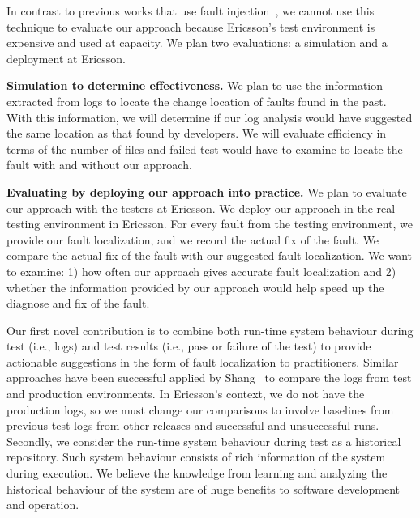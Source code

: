In contrast to previous works that use fault injection~\cite{todo}, we cannot use this technique to evaluate our approach because Ericsson's test environment is expensive and used at capacity. We plan two evaluations: a simulation and a deployment at Ericsson.

\noindent \textbf{Simulation to determine effectiveness.} We plan to use the information extracted from logs to locate the change location of faults found in the past. With this information, we will determine if our log analysis would have suggested the same location as that found by developers. We will evaluate efficiency in terms of the number of files and failed test would have to examine to locate the fault with and without our approach.
 
\noindent \textbf{Evaluating by deploying our approach into practice.} We plan to evaluate our approach with the testers at Ericsson. We deploy our approach in the real testing environment in Ericsson. For every fault from the testing environment, we provide our fault localization, and we record the actual fix of the fault. We compare the actual fix of the fault with our suggested fault localization. We want to examine: 1) how often our approach gives accurate fault localization and 2) whether the information provided by our approach would help speed up the diagnose and fix of the fault.


Our first novel contribution is to combine both run-time system behaviour during test (i.e., logs) and test results (i.e., pass or failure of the test) to provide actionable suggestions in the form of fault localization to practitioners. Similar approaches have been successful applied by Shang~\cite{Shang:2013:ADB:2486788.2486842} to compare the logs from test and production environments. In Ericsson's context, we do not have the production logs, so we must change our comparisons to involve baselines from previous test logs from other releases and successful and unsuccessful runs. Secondly, we consider the run-time system behaviour during test as a historical repository. Such system behaviour consists of rich information of the system during execution. We believe the knowledge from learning and analyzing the historical behaviour of the system are of huge benefits to software development and operation.

